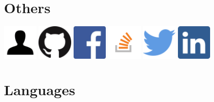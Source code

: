 \documentclass[11pt,a4paper,sans]{moderncv} %
\begin{document}
\section{Others}
\centerline{
\href{https://lucax88x.github.io}{\includegraphics[width=50pt]{profile}}
\quad
\href{https://github.com/lucax88x}{\includegraphics[width=50pt]{github}}
\quad
\href{https://facebook.com/luca.trazzi}{\includegraphics[width=50pt]{facebook}}
\quad
\href{http://stackoverflow.com/users/127041/luca-trazzi}{\includegraphics[width=50pt]{stackoverflow}}
\quad
\href{https://twitter.com/LucaTrazzi}{\includegraphics[width=50pt]{twitter}}
\quad
\href{https://www.linkedin.com/in/luca-trazzi-93217931}{\includegraphics[width=50pt]{linkedin}}
}


\section{Languages}
\end{document}
